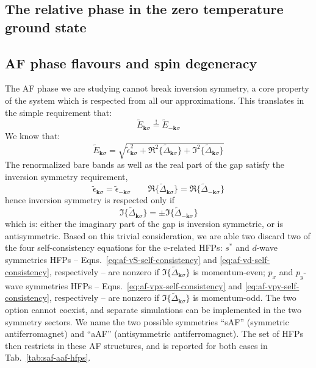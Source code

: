 \subsection{The relative phase in the zero temperature ground state}

\todo

\subsection{AF phase flavours and spin degeneracy}\label{subsec:ehm-af-flavours}

The AF phase we are studying cannot break inversion symmetry, a core property of the system which is respected from all our approximations. This translates in the simple requirement that:
\[
	\tilde{E}_{\mathbf{k}\sigma} \stackrel{!}{=} \tilde{E}_{-\mathbf{k}\sigma}
\]
We know that:
\[
	\tilde{E}_{\mathbf{k}\sigma} = \sqrt{
		\tilde{\epsilon}_{\mathbf{k}\sigma}^2 + \Re^2\lbrace \tilde{\Delta}_{\mathbf{k}\sigma}\rbrace+ \Im^2\lbrace \tilde{\Delta}_{\mathbf{k}\sigma}\rbrace
	}
\]
The renormalized bare bands as well as the real part of the gap satisfy the inversion symmetry requirement,
\[
	\tilde{\epsilon}_{\mathbf{k}\sigma} = \tilde{\epsilon}_{-\mathbf{k}\sigma}
	\qquad
	\Re\lbrace \tilde{\Delta}_{\mathbf{k}\sigma}\rbrace = \Re\lbrace \tilde{\Delta}_{-\mathbf{k}\sigma}\rbrace
\]
hence inversion symmetry is respected only if
\[
	\Im\lbrace \tilde{\Delta}_{\mathbf{k}\sigma}\rbrace = \pm\Im\lbrace \tilde{\Delta}_{-\mathbf{k}\sigma}\rbrace
\]
which is: either the imaginary part of the gap is inversion symmetric, or is antisymmetric. Based on this trivial consideration, we are able two discard two of the four self-consistency equations for the $v$-related HFPs: $s^*$ and $d$-wave symmetries HFPs -- Eqns.~\eqref{eq:af-vS-self-consistency} and \eqref{eq:af-vd-self-consistency}, respectively -- are nonzero if $\Im\lbrace \tilde{\Delta}_{\mathbf{k}\sigma}\rbrace$ is momentum-even; $p_x$ and $p_y$-wave symmetries HFPs -- Eqns.~\eqref{eq:af-vpx-self-consistency} and \eqref{eq:af-vpy-self-consistency}, respectively -- are nonzero if $\Im\lbrace \tilde{\Delta}_{\mathbf{k}\sigma}\rbrace$ is momentum-odd. The two option cannot coexist, and separate simulations can be implemented in the two symmetry sectors. We name the two possible symmetries ``sAF'' (symmetric antiferromagnet) and ``aAF'' (antisymmetric antiferromagnet). The set of HFPs then restricts in these AF structures, and is reported for both cases in Tab.~\ref{tab:saf-aaf-hfps}.

